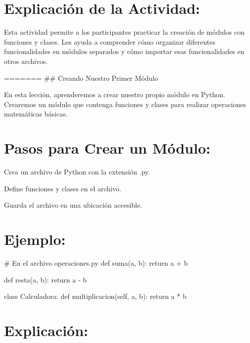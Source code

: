 \documentclass[
  a4paper,
  onepage,
  openany]{scrreprt}
\newenvironment{Shaded}{\begin{snugshade}}{\end{snugshade}}
\newcommand{\CommentTok}[1]{\textcolor[rgb]{0.37,0.37,0.37}{#1}}
\newcommand{\ControlFlowTok}[1]{\textcolor[rgb]{0.00,0.23,0.31}{#1}}
\newcommand{\KeywordTok}[1]{\textcolor[rgb]{0.00,0.23,0.31}{#1}}
\newcommand{\NormalTok}[1]{\textcolor[rgb]{0.00,0.23,0.31}{#1}}
\newcommand{\OperatorTok}[1]{\textcolor[rgb]{0.37,0.37,0.37}{#1}}
\newcommand{\VariableTok}[1]{\textcolor[rgb]{0.07,0.07,0.07}{#1}}
\begin{document}
\hypertarget{explicaciuxf3n-de-la-actividad-58}{%
\section{Explicación de la
Actividad:}\label{explicaciuxf3n-de-la-actividad-58}}

Esta actividad permite a los participantes practicar la creación de
módulos con funciones y clases. Les ayuda a comprender cómo organizar
diferentes funcionalidades en módulos separados y cómo importar esas
funcionalidades en otros archivos.

======= \#\# Creando Nuestro Primer Módulo

En esta lección, aprenderemos a crear nuestro propio módulo en Python.
Crearemos un módulo que contenga funciones y clases para realizar
operaciones matemáticas básicas.

\hypertarget{pasos-para-crear-un-muxf3dulo-1}{%
\section{Pasos para Crear un
Módulo:}\label{pasos-para-crear-un-muxf3dulo-1}}

Crea un archivo de Python con la extensión .py.

Define funciones y clases en el archivo.

Guarda el archivo en una ubicación accesible.

\hypertarget{ejemplo-61}{%
\section{Ejemplo:}\label{ejemplo-61}}

\begin{Shaded}
\begin{Highlighting}[]
\CommentTok{\# En el archivo operaciones.py}
\KeywordTok{def}\NormalTok{ suma(a, b):}
    \ControlFlowTok{return}\NormalTok{ a }\OperatorTok{+}\NormalTok{ b}

\KeywordTok{def}\NormalTok{ resta(a, b):}
    \ControlFlowTok{return}\NormalTok{ a }\OperatorTok{{-}}\NormalTok{ b}

\KeywordTok{class}\NormalTok{ Calculadora:}
    \KeywordTok{def}\NormalTok{ multiplicacion(}\VariableTok{self}\NormalTok{, a, b):}
        \ControlFlowTok{return}\NormalTok{ a }\OperatorTok{*}\NormalTok{ b}
\end{Highlighting}
\end{Shaded}

\hypertarget{explicaciuxf3n-61}{%
\section{Explicación:}\label{explicaciuxf3n-61}}
\end{document}
